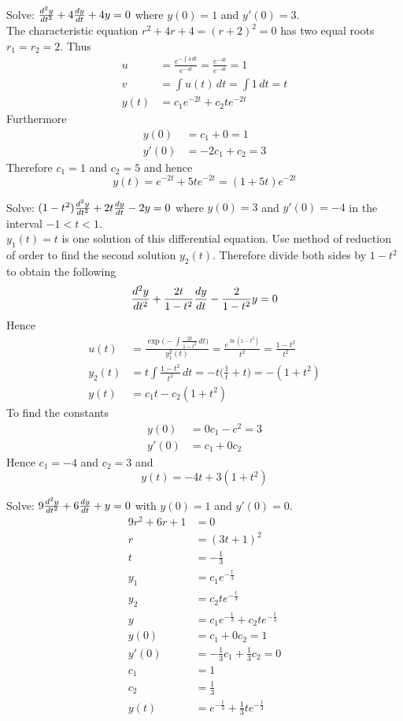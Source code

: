 \documentclass[12pt]{article}
\begin{document}
\begin{example} Solve: $\frac{d^2y}{dt^2} + 4\frac{dy}{dt} + 4y = 0$ where $y(0) = 1$ and $y'(0) = 3$. \\ The characteristic equation $r^2 + 4r + 4 = (r + 2)^2 = 0$ has two equal roots $r_1 = r_2 = 2$. Thus $$\begin{aligned} u &= \frac{e^{-\int 4 \, dt}}{e^{-4t}} = \frac{e^{-4t}}{e^{-4t}} = 1 \\ v &= \int u(t) \, dt = \int 1 \, dt = t \\ y(t) &= c_1e^{-2t} + c_2te^{-2t} \end{aligned} $$ 
Furthermore $$\begin{aligned} y(0) &= c_1 + 0 = 1 \\ y'(0) &= -2c_1 + c_2 = 3 \end{aligned} $$
Therefore $c_1 = 1$ and $c_2 = 5$ and hence $$y(t) = e^{-2t} + 5te^{-2t} = (1 + 5t)e^{-2t} $$ \end{example} 
\begin{example} Solve: $(1 - t^2)\frac{d^2y}{dt^2} + 2t\frac{dy}{dt} - 2y = 0$ where $y(0) = 3$ and $y'(0) = -4$ in the interval $-1 < t < 1$. \\ $y_1(t) = t$ is one solution of this differential equation. Use method of reduction of order to find the second solution $y_2(t)$. Therefore divide both sides by $1 - t^2$ to obtain the following $$\frac{d^2y}{dt^2} + \frac{2t}{1 - t^2}\frac{dy}{dt} - \frac{2}{1 - t^2}y = 0$$ Hence $$\begin{aligned} u(t) &= \frac{\exp\Big(-\int \frac{2t}{1 - t^2} \, dt\Big)}{y^2_1(t)} = \frac{e^{\ln(1 - t^2)}}{t^2} = \frac{1 - t^2}{t^2} \\ y_2(t) &= t\int \frac{1 - t^2}{t^2} \, dt = -t\Big(\frac{1}{t} + t\Big) = -(1 + t^2) \\ y(t) &= c_1t - c_2(1 + t^2) \end{aligned} $$ 
To find the constants $$\begin{aligned} y(0) &= 0c_1 - c^2 = 3 \\ y'(0) &= c_1 + 0c_2 \end{aligned} $$ 
Hence $c_1 = -4$ and $c_2 = 3$ and $$y(t) = -4t + 3(1 + t^2)$$ \end{example} 
\begin{example} Solve: $9\frac{d^2y}{dt^2} + 6\frac{dy}{dt}+ y = 0$ with $y(0) = 1$ and $y'(0) = 0$. $$\begin{aligned} 9r^2 + 6r + 1 &= 0 \\ r &= (3t + 1)^2 \\ t &= -\frac{1}{3} \\ y_1 &= c_1e^{-\frac{t}{3}} \\ y_2 &= c_2te^{-\frac{t}{3}} \\ y &= c_1e^{-\frac{t}{3}} + c_2te^{-\frac{t}{3}} \\ y(0) &= c_1 + 0c_2 = 1 \\ y'(0) &= -\frac{1}{3}c_1 + \frac{1}{3}c_2 = 0 \\ c_1 &= 1 \\ c_2 &= \frac{1}{3} \\ y(t) &= e^{-\frac{t}{3}} + \frac{1}{3}te^{-\frac{t}{3}} \end{aligned} $$ \end{example}
\end{document}
